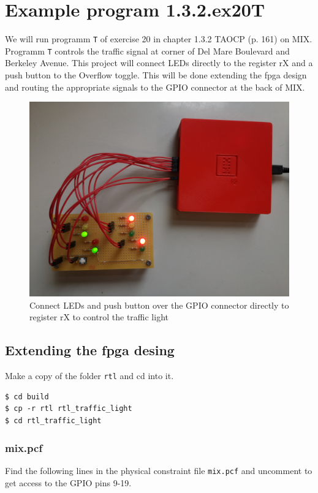 \documentclass[a4paper,ngerman]{scrartcl}
\begin{document}
\section{Example program 1.3.2.ex20T}
\label{traffic}
We will run programm \lstinline|T| of exercise 20 in chapter 1.3.2 TAOCP (p. 161) on MIX. Programm \lstinline|T| controls the traffic signal at corner of Del Mare Boulevard and Berkeley Avenue. This project will connect LEDs directly to the register rX and a push button to the  Overflow toggle. This will be done extending the fpga design and routing the appropriate signals to the GPIO connector at the back of MIX.

\begin{figure}
	\centering
	\includegraphics[width=0.7\linewidth]{MIX_traffic}
	\caption{Connect LEDs and push button over the GPIO connector directly to register rX to control the traffic light}
	\label{fig:mixtraffic}
\end{figure}


\subsection{Extending the fpga desing}

Make a copy of the folder \lstinline|rtl| and cd into it.

\begin{lstlisting}[numbers=none,frame=none]
$ cd build
$ cp -r rtl rtl_traffic_light
$ cd rtl_traffic_light
\end{lstlisting}


\subsubsection{mix.pcf}

Find the following lines in the physical constraint file \lstinline|mix.pcf| and uncomment to get access to the GPIO pins 9-19.
\end{document}
